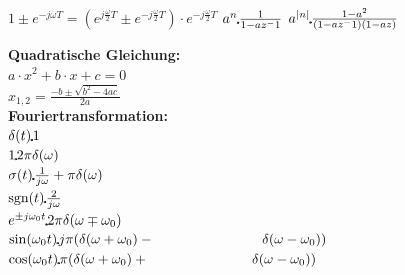 \begin{landscape}
\begin{minipage}{0.85\linewidth}
$1\pm e^{-j\omega T}= (e^{j\frac{\omega}{2} T}\pm e^{-j\frac{\omega}{2} T})\cdot e^{-j\frac{\omega}{2} T}$
\qquad
$a^n \FT \frac{1}{1-az^-1}$
\qquad
$a^{|n|} \FT \frac{1-a^2}{(1-az^-1)(1-az)}$
%
\renewcommand{\arraystretch}{1}\\


\vspace{-2cm}
\end{minipage}
\begin{minipage}{0.2\linewidth}
\textbf{Quadratische Gleichung:}\\
$a\cdot x^2+b\cdot x +c=0$\\

$x_{1,2}=\frac{-b\pm \sqrt{b^2-4ac}}{2a}$\\

\textbf{Fouriertransformation:}\\

$\delta(t)\FT 1$\\
$1\FT 2\pi \delta(\omega)$\\
$\sigma(t)\FT \frac{1}{j\omega}+\pi\delta(\omega)$\\
$\text{sgn}(t)\FT \frac{2}{j\omega}$\\
$e^{\pm j \omega_0 t} \FT 2\pi \delta(\omega \mp \omega_0)$\\
$\sin(\omega_0t)\FT j\pi(\delta(\omega +\omega_0)-\newline\text{\hspace{2.7cm}}\delta(\omega -\omega_0))$\\
$\cos(\omega_0t)\FT \pi(\delta(\omega +\omega_0)+\newline\text{\hspace{2.6cm}}\delta(\omega -\omega_0))$\\



\end{minipage}
\end{landscape}